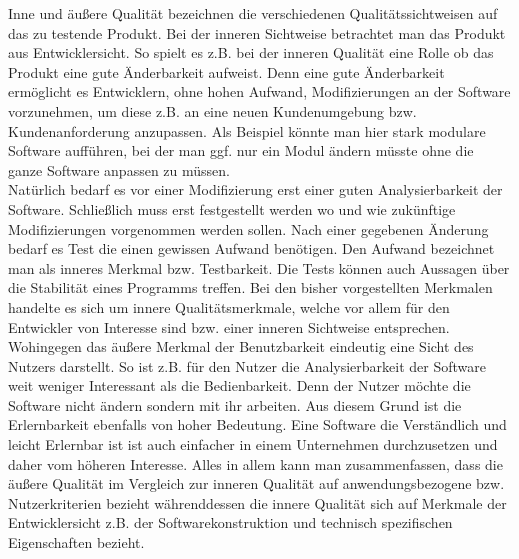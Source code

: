 \documentclass[a4paper, 12pt]{article}
\begin{document}
Inne und äußere Qualität bezeichnen die verschiedenen Qualitätssichtweisen auf das zu testende Produkt. Bei der inneren Sichtweise betrachtet man das Produkt aus Entwicklersicht. So spielt es z.B. bei der inneren Qualität eine Rolle ob das Produkt eine gute Änderbarkeit aufweist. Denn eine gute Änderbarkeit ermöglicht es Entwicklern, ohne hohen Aufwand, Modifizierungen an der Software vorzunehmen, um diese z.B. an eine neuen Kundenumgebung bzw. Kundenanforderung anzupassen. Als Beispiel könnte man hier stark modulare Software aufführen, bei der man ggf. nur ein Modul ändern müsste ohne die ganze Software anpassen zu müssen.\\

Natürlich bedarf es vor einer Modifizierung erst einer guten Analysierbarkeit der Software. Schließlich muss erst festgestellt werden wo und wie zukünftige Modifizierungen vorgenommen werden sollen.
Nach einer gegebenen Änderung bedarf es Test die einen gewissen Aufwand benötigen. Den Aufwand bezeichnet man als inneres Merkmal bzw. Testbarkeit. Die Tests können auch Aussagen über die Stabilität eines Programms treffen.
Bei den bisher vorgestellten Merkmalen handelte es sich um innere Qualitätsmerkmale, welche vor allem für den Entwickler von Interesse sind bzw. einer inneren Sichtweise entsprechen.\\

Wohingegen das äußere Merkmal der Benutzbarkeit eindeutig eine Sicht des Nutzers darstellt. So ist z.B. für den Nutzer die Analysierbarkeit der Software weit weniger Interessant als die Bedienbarkeit. Denn der Nutzer möchte die Software nicht ändern sondern mit ihr arbeiten. Aus diesem Grund ist die Erlernbarkeit ebenfalls von hoher Bedeutung. Eine Software die Verständlich und leicht Erlernbar ist ist auch einfacher in einem Unternehmen durchzusetzen und daher vom höheren Interesse. 
Alles in allem kann man zusammenfassen, dass die äußere Qualität im Vergleich zur inneren Qualität auf anwendungsbezogene bzw. Nutzerkriterien bezieht währenddessen die innere Qualität sich auf Merkmale der Entwicklersicht z.B. der Softwarekonstruktion und technisch spezifischen Eigenschaften bezieht. 
\end{document}
